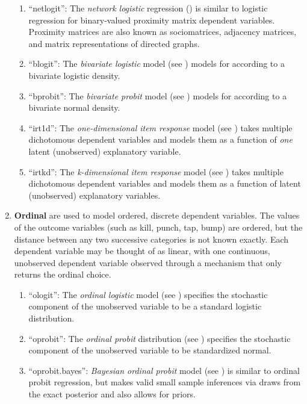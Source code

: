 \documentclass[letterpaper,10pt,english]{sphinxmanual}
\begin{document}
\begin{enumerate}
\begin{enumerate}
\item {} 
“netlogit”: The \emph{network logistic} regression () is similar to
logistic regression for binary-valued proximity matrix dependent
variables. Proximity matrices are also known as sociomatrices,
adjacency matrices, and matrix representations of directed graphs.

\item {} 
“blogit”: The \emph{bivariate logistic} model (see ) models
 for
 according to a
bivariate logistic density.

\item {} 
“bprobit”: The \emph{bivariate probit} model (see ) models
 for
 according to a
bivariate normal density.

\item {} 
“irt1d”: The \emph{one-dimensional item response} model (see ) takes
multiple dichotomous dependent variables and models them as a
function of \emph{one} latent (unobserved) explanatory variable.

\item {} 
“irtkd”: The \emph{k-dimensional item response} model (see ) takes
multiple dichotomous dependent variables and models them as a
function of  latent (unobserved) explanatory variables.

\end{enumerate}

\item {} 
\textbf{Ordinal} are used to model ordered, discrete dependent variables.
The values of the outcome variables (such as kill, punch, tap, bump)
are ordered, but the distance between any two successive categories
is not known exactly. Each dependent variable may be thought of as
linear, with one continuous, unobserved dependent variable observed
through a mechanism that only returns the ordinal choice.
\begin{enumerate}
\item {} 
“ologit”: The \emph{ordinal logistic} model (see ) specifies the
stochastic component of the unobserved variable to be a standard
logistic distribution.

\item {} 
“oprobit”: The \emph{ordinal probit} distribution (see ) specifies the
stochastic component of the unobserved variable to be standardized
normal.

\item {} 
“oprobit.bayes”: \emph{Bayesian ordinal probit} model (see ) is similar
to ordinal probit regression, but makes valid small sample
inferences via draws from the exact posterior and also allows for
priors.


\end{enumerate}
\end{enumerate}
\end{document}
